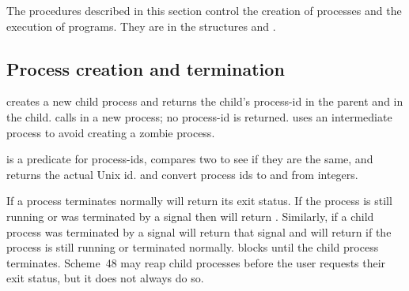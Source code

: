 The procedures described in this section control the creation of processes
 and the execution of programs.
They are in the structures  and .

\subsection{Process creation and termination}
\label{processes}

\begin{protos}
\end{protos}
\noindent
{} creates a new child process and returns the child's process-id in
 the parent and  in the child.
 calls  in a new process; no process-id
 is returned.
 uses an intermediate process to avoid creating
 a zombie process.

\begin{protos}
\end{protos}
\noindent
 is a predicate for process-ids,
 compares two to see if they are the same,
 and  returns the actual Unix id.
 and 
 convert process ids to and from integers.

\begin{protos}
\end{protos}
\noindent
If a process terminates normally
  will return its exit status.
If the process is still running or was terminated by a signal then
  will return .
Similarly, if a child process was terminated by a signal
  will return that signal and
 will return  if the process is still running or terminated
 normally.
 blocks until the child process terminates.
Scheme~48 may reap child processes before the user requests their
 exit status, but it does not always do so.

